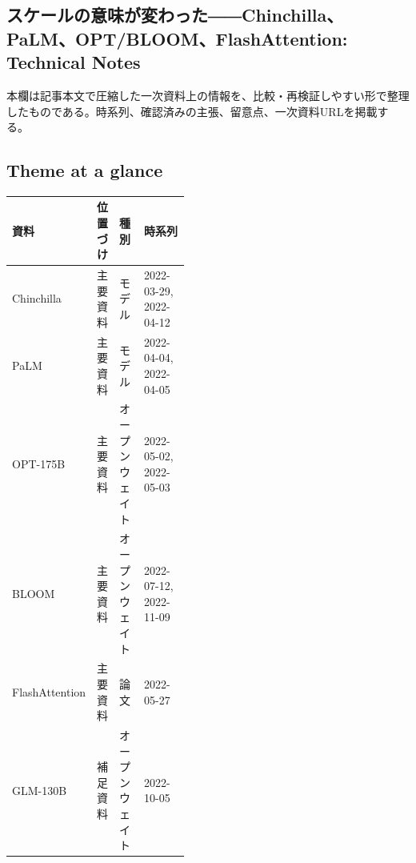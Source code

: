 \subsection*{スケールの意味が変わった――Chinchilla、PaLM、OPT/BLOOM、FlashAttention: Technical Notes}
本欄は記事本文で圧縮した一次資料上の情報を、比較・再検証しやすい形で整理したものである。時系列、確認済みの主張、留意点、一次資料URLを掲載する。
\smallskip
{}\par
\medskip
\subsection*{Theme at a glance}
\begin{center}
\footnotesize
\begin{tabularx}{\linewidth}{@{}p{0.20\linewidth}p{0.10\linewidth}p{0.14\linewidth}X@{}}
\toprule
資料 & 位置づけ & 種別 & 時系列 \\
\midrule
Chinchilla & 主要資料 & モデル & 2022-03-29, 2022-04-12 \\
PaLM & 主要資料 & モデル & 2022-04-04, 2022-04-05 \\
OPT-175B & 主要資料 & オープンウェイト & 2022-05-02, 2022-05-03 \\
BLOOM & 主要資料 & オープンウェイト & 2022-07-12, 2022-11-09 \\
FlashAttention & 主要資料 & 論文 & 2022-05-27 \\
GLM-130B & 補足資料 & オープンウェイト & 2022-10-05 \\
\bottomrule
\end{tabularx}
\end{center}
\normalsize

